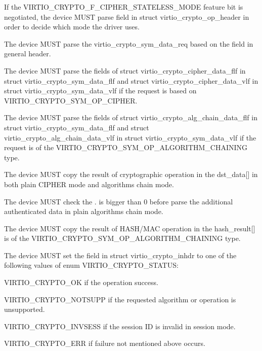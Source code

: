 
\begin{itemize*}
\item If the VIRTIO_CRYPTO_F_CIPHER_STATELESS_MODE feature bit is negotiated, the device
    MUST parse  field in struct virtio_crypto_op_header in order to decide
	which mode the driver uses.
\item The device MUST parse the virtio_crypto_sym_data_req based on the 
    field in general header.
\item The device MUST parse the fields of struct virtio_crypto_cipher_data_flf in
    struct virtio_crypto_sym_data_flf and struct virtio_crypto_cipher_data_vlf in
    struct virtio_crypto_sym_data_vlf if the request is based on VIRTIO_CRYPTO_SYM_OP_CIPHER.
\item The device MUST parse the fields of struct virtio_crypto_alg_chain_data_flf
    in struct virtio_crypto_sym_data_flf and struct virtio_crypto_alg_chain_data_vlf
    in struct virtio_crypto_sym_data_vlf if the request is of the VIRTIO_CRYPTO_SYM_OP_ALGORITHM_CHAINING
    type.
\item The device MUST copy the result of cryptographic operation in the dst_data[] in
    both plain CIPHER mode and algorithms chain mode.
\item The device MUST check the . is bigger than 0 before
    parse the additional authenticated data in plain algorithms chain mode.
\item The device MUST copy the result of HASH/MAC operation in the hash_result[] is
    of the VIRTIO_CRYPTO_SYM_OP_ALGORITHM_CHAINING type.
\item The device MUST set the  field in struct virtio_crypto_inhdr to
    one of the following values of enum VIRTIO_CRYPTO_STATUS:
\begin{itemize*}
\item VIRTIO_CRYPTO_OK if the operation success.
\item VIRTIO_CRYPTO_NOTSUPP if the requested algorithm or operation is unsupported.
\item VIRTIO_CRYPTO_INVSESS if the session ID is invalid in session mode.
\item VIRTIO_CRYPTO_ERR if failure not mentioned above occurs.
\end{itemize*}
\end{itemize*}

